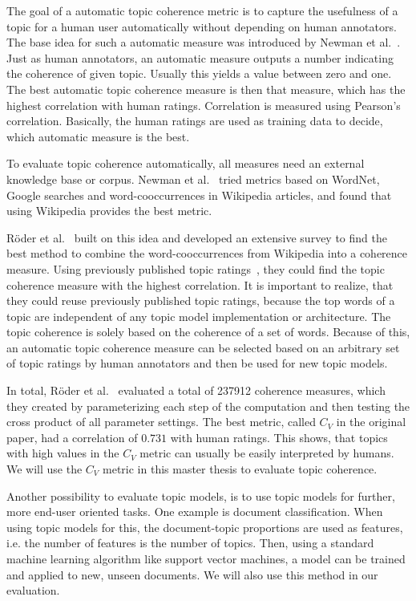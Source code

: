 \documentclass[
        a4paper,
        titlepage,
        twoside,
        parskip
        ]{scrbook}
\theoremstyle{break}
\begin{document}
The goal of a automatic topic coherence metric is to capture the usefulness of a topic for a human user automatically without depending on human annotators.
The base idea for such a automatic measure was introduced by Newman et al.~\cite{Newman2010}.
Just as human annotators, an automatic measure outputs a number indicating the coherence of given topic.
Usually this yields a value between zero and one.
The best automatic topic coherence measure is then that measure, which has the highest correlation with human ratings.
Correlation is measured using Pearson's correlation.
Basically, the human ratings are used as training data to decide, which automatic measure is the best.

To evaluate topic coherence automatically, all measures need an external knowledge base or corpus.
Newman et al.~\cite{Newman2010} tried metrics based on WordNet, Google searches and word-cooccurrences in Wikipedia articles, and found that using Wikipedia provides the best metric.

Röder et al.~\cite{Roder2015} built on this idea and developed an extensive survey to find the best method to combine the word-cooccurrences from Wikipedia into a coherence measure.
Using previously published topic ratings~\cite{Aletras2013,Chang2009,Newman2010,Rosner2013}, they could find the topic coherence measure with the highest correlation.
It is important to realize, that they could reuse previously published topic ratings, because the top words of a topic are independent of any topic model implementation or architecture.
The topic coherence is solely based on the coherence of a set of words.
Because of this, an automatic topic coherence measure can be selected based on an arbitrary set of topic ratings by human annotators and then be used for new topic models.

In total, Röder et al.~\cite{Roder2015} evaluated a total of 237912 coherence measures, which they created by parameterizing each step of the computation and then testing the cross product of all parameter settings.
The best metric, called $C_V$ in the original paper, had a correlation of $0.731$ with human ratings.
This shows, that topics with high values in the $C_V$ metric can usually be easily interpreted by humans.
We will use the $C_V$ metric in this master thesis to evaluate topic coherence.

Another possibility to evaluate topic models, is to use topic models for further, more end-user oriented tasks.
One example is document classification.
When using topic models for this, the document-topic proportions are used as features, i.e. the number of features is the number of topics.
Then, using a standard machine learning algorithm like support vector machines, a model can be trained and applied to new, unseen documents.
We will also use this method in our evaluation.
\end{document}
